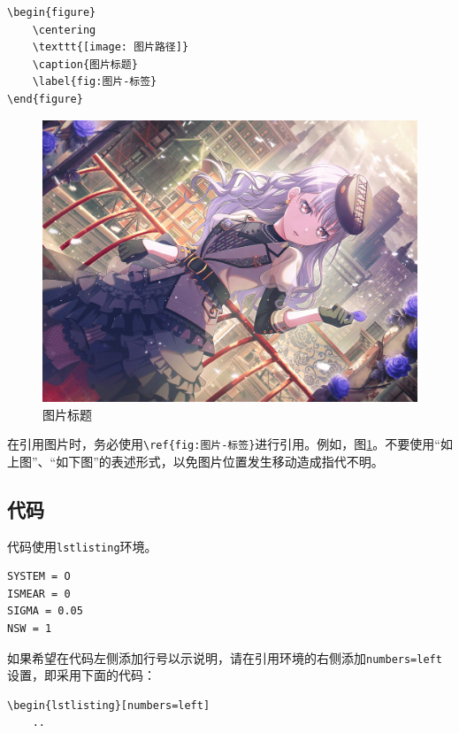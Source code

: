 \begin{lstlisting}[frame=line]
\begin{figure}
    \centering
    \texttt{[image: 图片路径]}
    \caption{图片标题}
    \label{fig:图片-标签}
\end{figure}
\end{lstlisting}

\begin{figure}
    \centering
    \includegraphics[width=1\linewidth]{fig.png}
    \caption{图片标题}
    \label{fig:图片-标签}
\end{figure}

\begin{attention}
    在引用图片时，务必使用\verb|\ref{fig:图片-标签}|进行引用。例如，图\ref{fig:图片-标签}。不要使用“如上图”、“如下图”的表述形式，以免图片位置发生移动造成指代不明。
\end{attention}

\subsection{代码}\label{subsec:关于如何编写模板（教程）-代码}

代码使用\verb|lstlisting|环境。

\begin{lstlisting}
SYSTEM = O
ISMEAR = 0
SIGMA = 0.05
NSW = 1
\end{lstlisting}

如果希望在代码左侧添加行号以示说明，请在引用环境的右侧添加\verb|numbers=left|设置，即采用下面的代码：

\begin{lstlisting}[frame=line]
\begin{lstlisting}[numbers=left]
    ..
\end{lstlisting}

